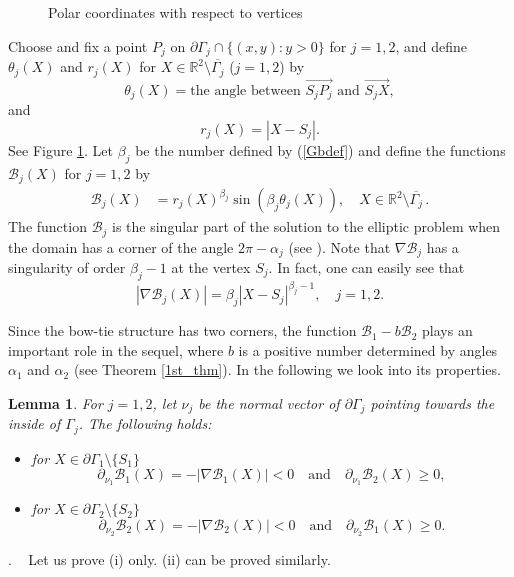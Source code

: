 \documentclass[11pt,a4paper]{article}
\numberwithin{equation}{section}
\newtheorem{lem}[thm]{Lemma}
\newcommand{\pf}{\noindent {\sl Proof}. \ }
\newcommand{\p}{\partial}
\newcommand{\eqnref}[1]{(\ref {#1})}
\newcommand{\Rbb}{\mathbb{R}}
\newcommand{\Bcal}{\mathcal{B}}
\newcommand{\Ga}{\alpha}
\newcommand{\Gb}{\beta}
\newcommand{\Gt}{\theta}
\newcommand{\GG}{\Gamma}
\newcommand{\beq}{\begin{equation}}
\newcommand{\eeq}{\end{equation}}
\begin{document}
\begin{figure}[h!]
\begin{center}
\end{center}
\caption{Polar coordinates with respect to vertices}\label{Fig2}
\end{figure}

Choose and fix a point $P_j$ on $\p\GG_j \cap \{ (x,y): y>0 \}$ for $j=1,2$, and define $\Gt_j(X)$ and $r_j(X)$ for $X \in \Rbb^2 \setminus \overline {\GG_j}$ ($j=1,2$) by
\beq\label{angle}
\mbox{$\Gt_j(X)=$the angle between $\overrightarrow {S_j P_j}$ and $\overrightarrow{S_j X}$},
\eeq
and
\beq\label{rldef}
r_j(X) =  |X-S_j|.
\eeq
See Figure \ref{Fig2}. Let $\Gb_j$ be the number defined by \eqnref{Gbdef}
and define the functions $\Bcal_j(X)$ for $j=1,2$ by
\begin{align}
\Bcal_j(X) &= r_j (X)^{\Gb_j} \sin (\Gb_j \Gt_j (X)), \quad X \in \Rbb^2 \setminus \overline {\GG_j} \,  .
\end{align}
The function $\Bcal_j$ is the singular part of the solution to the elliptic problem when the domain has a corner of the angle $2\pi-\Ga_j$ (see \cite{Grisvard-book}). Note that $\nabla \Bcal_j$ has a singularity of order $\Gb_j-1$ at the vertex $S_j$. In fact, one can easily see that
\beq\label{naBcalj}
|\nabla \Bcal_j(X)| = \Gb_j |X-S_j|^{\Gb_j-1}, \quad j=1,2.
\eeq

Since the bow-tie structure has two corners, the function $\Bcal_1 - b\Bcal_2$ plays an important role in the sequel, where $b$ is a positive number determined by angles $\Ga_1$ and $\Ga_2$ (see Theorem \ref{1st_thm}). In the following we look into its properties.

\begin{lem}\label{One}
For $j=1,2$, let $\nu_j$ be the normal vector of $\p \GG_j$ pointing towards the inside of $\GG_j$. The following holds:
\begin{itemize}
\item[(i)] for $X \in \p\GG_1 \setminus \{ S_1 \}$
\beq\label{Gammaone}
\p_{\nu_1} \Bcal_1(X) = - | \nabla \Bcal_1(X)| < 0 \quad\mbox{and}\quad  \p_{\nu_1} \Bcal_2\left ( X\right) \ge 0,
\eeq

\item[(ii)] for $X \in \p\GG_2 \setminus \{ S_2 \}$
\beq
\p_{\nu_2} \Bcal_2\left ( X\right) = - \left| \nabla \Bcal_2\left ( X\right)\right | < 0 \quad\mbox{and}\quad  \p_{\nu_2} \Bcal_1\left ( X\right) \ge 0.
\eeq
\end{itemize}
\end{lem}
\pf
Let us prove (i) only. (ii) can be proved similarly.
\end{document}
